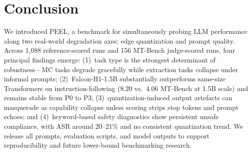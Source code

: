 \documentclass[letterpaper]{article} %
\begin{document}


\section{Conclusion}
\label{sec:conclusion}

We introduced PEEL, a benchmark for simultaneously probing LLM performance
along two real-world degradation axes: edge quantization and prompt quality.
Across 1,088 reference-scored runs and 156 MT-Bench
judge-scored runs, four principal findings emerge:
(1)~task type is the strongest determinant of robustness---MC tasks degrade
gracefully while extraction tasks collapse under informal prompts;
(2)~Falcon-H1-1.5B substantially outperforms same-size Transformers on
instruction-following (8.20 vs.\ 4.06 MT-Bench at 1.5B scale) and remains
stable from P0 to P3;
(3)~quantization-induced output artefacts can masquerade as capability collapse
unless scoring strips stop tokens and prompt echoes; and
(4)~keyword-based safety diagnostics show persistent unsafe compliance, with
ASR around 20--21\% and no consistent quantization trend.
We release all prompts, evaluation scripts, and model outputs to support
reproducibility and future lower-bound benchmarking research.
\end{document}
